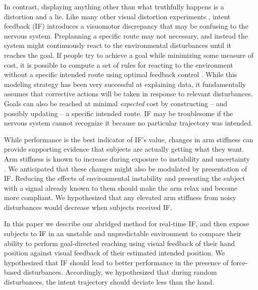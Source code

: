\documentclass{frontiersSCNS} %
\begin{document}
In contrast, displaying anything other than what truthfully happens is a distortion and a lie. Like many other visual distortion experiments \citep{miles1980long, pine1996learning}, intent feedback (IF) introduces a visuomotor discrepancy that may be confusing to the nervous system. Preplanning a specific route may not necessary, and instead the system might continuously react to the environmental disturbances until it reaches the goal. If people try to achieve a goal while minimizing some measure of cost, it is possible to compute a set of rules for reacting to the environment without a specific intended route using optimal feedback control \citep{todorov2002optimal}. While this modeling strategy has been very successful at explaining data, it fundamentally assumes that corrective actions will be taken in response to relevant disturbances. Goals can also be reached at minimal \textit{expected} cost by constructing -- and possibly updating -- a specific intended route. IF may be troublesome if the nervous system cannot recognize it because no particular trajectory was intended.

While performance is the best indicator of IF's value, changes in arm stiffness can provide supporting evidence that subjects are actually getting what they want. Arm stiffness is known to increase during exposure to instability \citep{franklin2003adaptation} and uncertainty \citep{takahashi2001impedance}. We anticipated that these changes might also be modulated by presentation of IF. Reducing the effects of environmental instability and presenting the subject with a signal already known to them should make the arm relax and become more compliant. We hypothesized that any elevated arm stiffness from noisy disturbances would decrease when subjects received IF.

In this paper we describe our abridged method for real-time IF, and then expose subjects to IF in an unstable and unpredictable environment to compare their ability to perform goal-directed reaching using visual feedback of their hand position against visual feedback of their estimated intended position. We hypothesized that IF should lead to better performance in the presence of force-based disturbances. Accordingly, we hypothesized that during random disturbances, the intent trajectory should deviate less than the hand.
\end{document}
